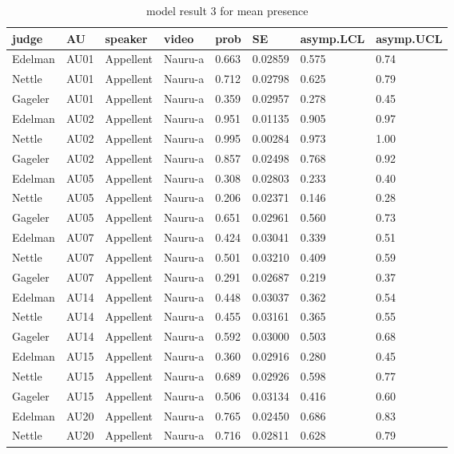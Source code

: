 \documentclass{monashthesis}
\begin{document}
\begin{center}
\begin{longtable}{llllllll}
\caption{model result 3 for mean presence}\\
\toprule
judge & AU & speaker & video & prob & SE & asymp.LCL & asymp.UCL \\
\midrule
\endhead
\bottomrule
\endfoot
Edelman & AU01 & Appellent & Nauru-a & 0.663 & 0.02859 & 0.575 & 0.74 \\
Nettle & AU01 & Appellent & Nauru-a & 0.712 & 0.02798 & 0.625 & 0.79 \\
Gageler & AU01 & Appellent & Nauru-a & 0.359 & 0.02957 & 0.278 & 0.45 \\
Edelman & AU02 & Appellent & Nauru-a & 0.951 & 0.01135 & 0.905 & 0.97 \\
Nettle & AU02 & Appellent & Nauru-a & 0.995 & 0.00284 & 0.973 & 1.00 \\
Gageler & AU02 & Appellent & Nauru-a & 0.857 & 0.02498 & 0.768 & 0.92 \\
Edelman & AU05 & Appellent & Nauru-a & 0.308 & 0.02803 & 0.233 & 0.40 \\
Nettle & AU05 & Appellent & Nauru-a & 0.206 & 0.02371 & 0.146 & 0.28 \\
Gageler & AU05 & Appellent & Nauru-a & 0.651 & 0.02961 & 0.560 & 0.73 \\
Edelman & AU07 & Appellent & Nauru-a & 0.424 & 0.03041 & 0.339 & 0.51 \\
Nettle & AU07 & Appellent & Nauru-a & 0.501 & 0.03210 & 0.409 & 0.59 \\
Gageler & AU07 & Appellent & Nauru-a & 0.291 & 0.02687 & 0.219 & 0.37 \\
Edelman & AU14 & Appellent & Nauru-a & 0.448 & 0.03037 & 0.362 & 0.54 \\
Nettle & AU14 & Appellent & Nauru-a & 0.455 & 0.03161 & 0.365 & 0.55 \\
Gageler & AU14 & Appellent & Nauru-a & 0.592 & 0.03000 & 0.503 & 0.68 \\
Edelman & AU15 & Appellent & Nauru-a & 0.360 & 0.02916 & 0.280 & 0.45 \\
Nettle & AU15 & Appellent & Nauru-a & 0.689 & 0.02926 & 0.598 & 0.77 \\
Gageler & AU15 & Appellent & Nauru-a & 0.506 & 0.03134 & 0.416 & 0.60 \\
Edelman & AU20 & Appellent & Nauru-a & 0.765 & 0.02450 & 0.686 & 0.83 \\
Nettle & AU20 & Appellent & Nauru-a & 0.716 & 0.02811 & 0.628 & 0.79 \\

\end{longtable}
\end{center}
\end{document}
